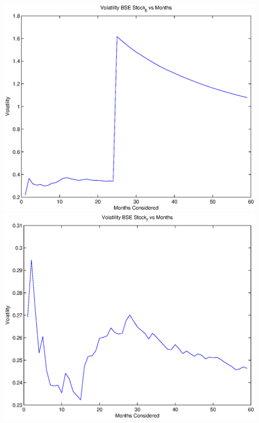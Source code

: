 \documentclass{article}
\begin{document}
\includegraphics[width=\textwidth]{Volatility_BSE_Stock_6_vs_Months} \\

\includegraphics[width=\textwidth]{Volatility_BSE_Stock_7_vs_Months} \\
\end{document}
